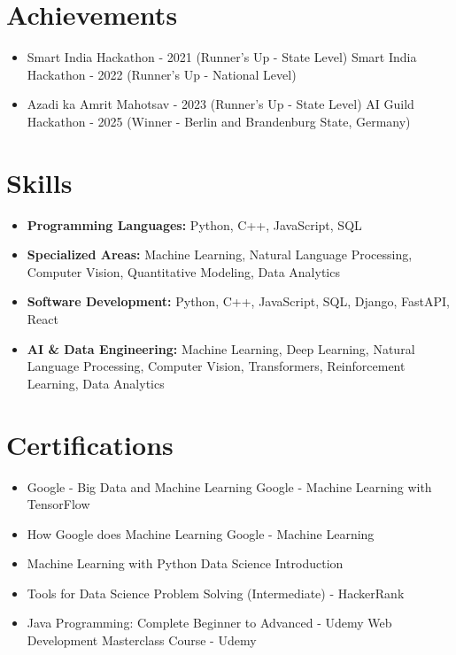 \documentclass[a4paper,10pt]{article}
\begin{document}
\section*{Achievements}
\begin{itemize}
\item Smart India Hackathon - 2021 (Runner's Up - State Level) \hfill Smart India Hackathon - 2022 (Runner's Up - National Level)
\item Azadi ka Amrit Mahotsav - 2023 (Runner's Up - State Level) \hfill AI Guild Hackathon - 2025 (Winner - Berlin and Brandenburg State, Germany)
\end{itemize}

\section*{Skills}
\begin{itemize}
  \item \textbf{Programming Languages:} Python, C++, JavaScript, SQL
  \item \textbf{Specialized Areas:} Machine Learning, Natural Language Processing, Computer Vision, Quantitative Modeling, Data Analytics
  \item \textbf{Software Development:} Python, C++, JavaScript, SQL, Django, FastAPI, React
  \item \textbf{AI \& Data Engineering:} Machine Learning, Deep Learning, Natural Language Processing, Computer Vision, Transformers, Reinforcement Learning, Data Analytics
\end{itemize}

\section*{Certifications}
\begin{itemize}
\item Google - Big Data and Machine Learning \hfill Google - Machine Learning with TensorFlow
\item How Google does Machine Learning \hfill Google - Machine Learning
\item Machine Learning with Python \hfill Data Science Introduction
\item Tools for Data Science \hfill Problem Solving (Intermediate) - HackerRank
\item Java Programming: Complete Beginner to Advanced - Udemy \hfill Web Development Masterclass Course - Udemy
\end{itemize}
\end{document}
